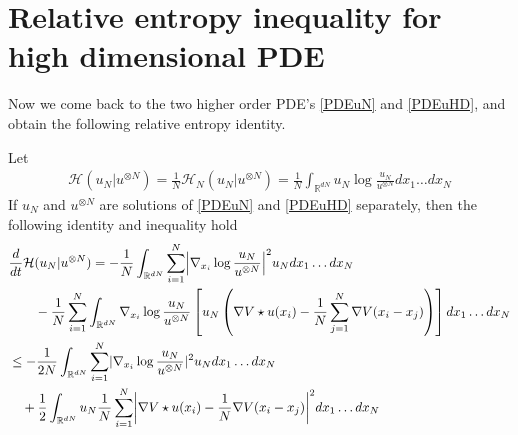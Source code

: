 \section{Relative entropy inequality for high dimensional PDE}
Now we come back to the two higher order PDE's \autoref{PDEuN} and \autoref{PDEuHD}, and obtain the following relative entropy identity.
\begin{lemma} Let 
	\begin{align}
	\label{REntropyN} \mathcal{H}(u_N | u^{\otimes N} )= \frac{1}{N} \mathcal{H}_N(u_N | u^{\otimes N} ) = \frac{1}{N} \int_{\mathbb{R}^{dN} } u_N \log \frac{u_N}{u^{\otimes N} }   dx_{1}\ldots dx_N
	\end{align}
	If $u_N$ and $u^{\otimes N}$ are solutions of  \autoref{PDEuN} and \autoref{PDEuHD} separately, then the following identity and inequality hold
	\begin{align}
	\label{relativeentropyID} 
	&\frac{d}{dt} \mathcal{H}(u_{N} | u^{\otimes N}  ) = -   \frac{1}{N} \int_{\mathbb{R}^{dN} } \sum_{i=1}^{N}  \abs*{\nabla_{x_i} \log \frac{u_N}{u^{\otimes N} }}^2 u_N dx_{1}\ldots dx_N\\
\nonumber	&\qquad - \frac{1}{N} \sum_{i=1}^{N} \int_{\mathbb{R}^{dN} }  \nabla_{x_i} \log \frac{u_N}{u^{\otimes N} } \left[ u_N \left(\nabla V \star u(x_i) - \frac{1}{N} \sum_{j=1}^{N} \nabla V(x_i-x_j) \right) \right]   dx_{1}\ldots dx_N\\
\label{REntropyNM}  &\le - \frac{1}{2N} \int_{\mathbb{R}^{dN} } \sum_{i=1}^{N} \abs{\nabla_{x_i} \log \frac{u_N}{u^{\otimes N} }}^2 u_N dx_{1}\ldots dx_N\\
\nonumber &\quad + \frac{1}{2} \int_{\mathbb{R}^{dN} } u_N \frac{1}{N} \sum_{i=1}^{N}  \abs*{\nabla V \star  u (x_i) - \frac{1}{N} \nabla V(x_i-x_j) }^2 dx_{1}\ldots dx_N
	\end{align}
\end{lemma}
